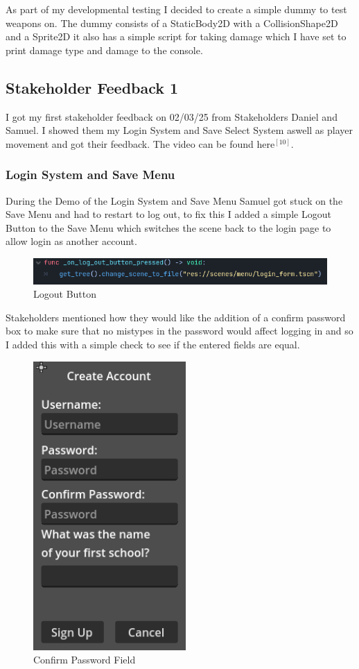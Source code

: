 \documentclass{article}
\begin{document}
        As part of my developmental testing I decided to create a simple dummy to test weapons on. The dummy consists of a StaticBody2D with a CollisionShape2D and a Sprite2D it also has a simple script for taking damage which I have set to print damage type and damage to the console.\\
        \subsection{Stakeholder Feedback 1}
        I got my first stakeholder feedback on 02/03/25 from Stakeholders Daniel and Samuel. I showed them my Login System and Save Select System aswell as player movement and got their feedback. The video can be found here$^{[10]}$.
        \subsubsection{Login System and Save Menu}
        During the Demo of the Login System and Save Menu Samuel got stuck on the Save Menu and had to restart to log out, to fix this I added a simple Logout Button to the Save Menu which switches the scene back to the login page to allow login as another account.\\
        \begin{figure}[H]
                \centering
                \includegraphics[width = 0.9\columnwidth]{images/development/SaveMenu_logout.PNG}
                \caption{Logout Button}
        \end{figure}
        Stakeholders mentioned how they would like the addition of a confirm password box to make sure that no mistypes in the password would affect logging in and so I added this with a simple check to see if the entered fields are equal.\\
        \begin{figure}[H]
                \centering
                \includegraphics[width = 0.3\columnwidth]{images/development/CreateAccountForm_layout2.PNG}
                \caption{Confirm Password Field}
        \end{figure}
\end{document}

